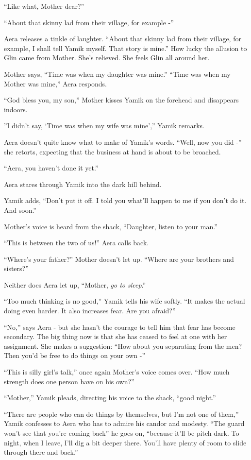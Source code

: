 \documentclass[twoside,11pt]{book}
\begin{document}
``Like what, Mother dear?''

``About that skinny lad from their village, for example -''

Aera releases a tinkle of laughter.  ``About that skinny lad from their village, for example, I shall tell Yamik myself.
That story is mine.'' How lucky the allusion to Glin came from Mother. She's relieved. She feels Glin all around her.

Mother says, ``Time was when my daughter was mine.''
``Time was when my Mother was mine,'' Aera responds.

``God bless you, my son,'' Mother kisses Yamik on the forehead and disappears indoors.

''I didn't say, `Time was when my wife was mine','' Yamik remarks.

Aera doesn't quite know what to make of Yamik's words. ``Well, now you did
-'' she retorts, expecting that the business at hand is about to be broached.

``Aera, you haven't done it yet.'' 

Aera stares through Yamik into the dark hill behind.

Yamik adds, ``Don't put it off. I told you what'll happen to me if you don't do it. And soon.''

Mother's voice is heard from the shack, ``Daughter, listen to your man.''

 ``This is between the two of us!'' Aera calls back.

``Where's your father?''  Mother doesn't let up. ``Where are your brothers
and sisters?''

Neither does Aera let up, ``Mother, \textit{go to sleep}.''

``Too much thinking is no good,'' Yamik tells his wife softly. ``It makes the actual doing
even harder. It also increases fear. Are you afraid?''

``No,'' says Aera - but she hasn't the courage to tell him that fear has
become secondary. The big thing now is that she has ceased to feel at one with her assignment. She makes a suggestion:
``How about you separating from the men? Then you'd be free to do things on your own -''

``This is silly girl's talk,'' once again Mother's voice comes over. ``How much strength
does one person have on his own?''

``Mother,'' Yamik pleads, directing his voice to the shack, ``good night.''

``There are people who can do things by themselves, but I'm not one of them,''
Yamik confesses to Aera who has to admire his candor and modesty. ``The guard
won't see that you're coming back'' he goes on, ``because it'll be pitch dark. To-night, when I leave, I'll dig a bit
deeper there. You'll have plenty of room to slide through there and back.''
\end{document}
